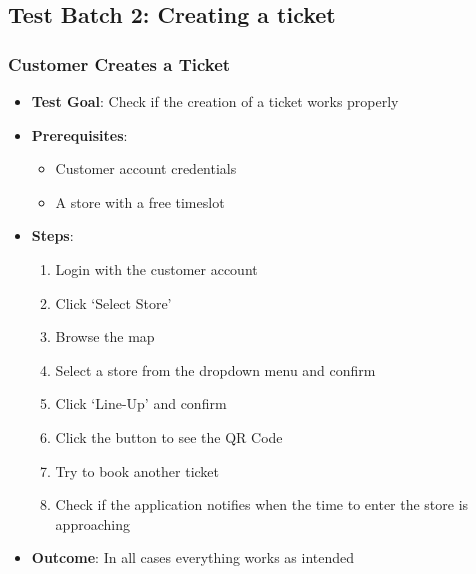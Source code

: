 \subsection{Test Batch 2: Creating a ticket}
\subsubsection{Customer Creates a Ticket}
\begin{itemize}
    \item \textbf{Test Goal}: Check if the creation of a ticket works properly
    \item \textbf{Prerequisites}:
          \begin{itemize}
              \item Customer account credentials
              \item A store with a free timeslot
          \end{itemize}
    \item \textbf{Steps}:
          \begin{enumerate}
              \item Login with the customer account
              \item Click `Select Store'
              \item Browse the map
              \item Select a store from the dropdown menu and confirm
              \item Click `Line-Up' and confirm
              \item Click the button to see the QR Code
              \item Try to book another ticket
              \item Check if the application notifies when the time to enter the store is approaching
          \end{enumerate}
    \item \textbf{Outcome}: In all cases everything works as intended
\end{itemize}
